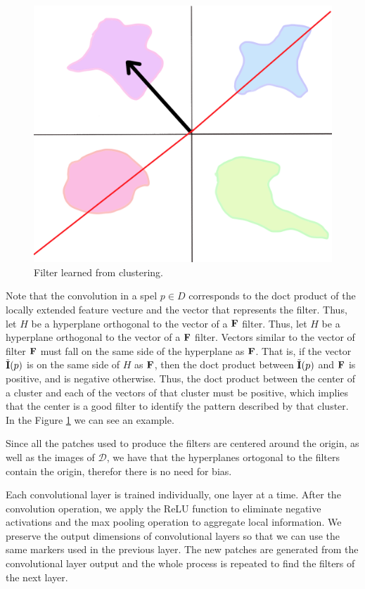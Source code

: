 \documentclass[10pt,twocolumn,letterpaper]{article}
\newcommand{\D}{\mathcal{D}}
\newcommand{\m}[1]{{\mathrm{\bf #1}}}
\newcommand{\E}{\tilde{\m{I}}}
\newcommand{\mF}{\m{F}}
\begin{document}
\begin{figure}[t]
  \begin{center}
     \includegraphics[width=0.8\linewidth]{figures/filter.png}
  \end{center}
     \caption{Filter learned from clustering.}
  \label{fig:filter}
\end{figure}

Note that the convolution in a spel $p \in D$ corresponds to the doct product of the locally extended feature vecture and the vector that represents the filter. Thus, let $H$ be a hyperplane orthogonal to the vector of a $\mF$ filter. Thus, let $ H $ be a hyperplane orthogonal to the vector of a $ \mF$ filter. Vectors similar to the vector of filter $\mF$ must fall on the same side of the hyperplane as $\mF$. That is, if the vector $\E(p)$ is on the same side of $H$ as $\mF$, then the doct product between $\E (p)$ and $\mF$ is positive, and is negative otherwise. Thus, the doct product between the center of a cluster and each of the vectors of that cluster must be positive, which implies that the center is a good filter to identify the pattern described by that cluster. In the Figure \ref{fig:filter} we can see an example.

Since all the patches used to produce the filters are centered around the origin, as well as the images of $\D$, we have that the hyperplanes ortogonal to the filters contain the origin, therefor there is no need for bias.

Each convolutional layer is trained individually, one layer at a time. After the convolution operation, we apply the ReLU function to eliminate negative activations and the max pooling operation to aggregate local information. We preserve the output dimensions of convolutional layers so that we can use the same markers used in the previous layer. The new patches are generated from the convolutional layer output and the whole process is repeated to find the filters of the next layer.
\end{document}
